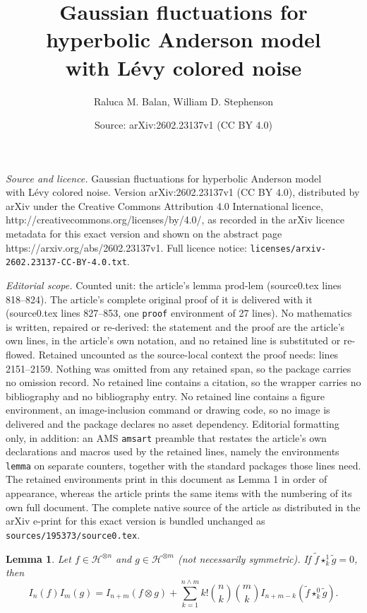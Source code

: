 \documentclass[10pt,a4paper]{amsart}
\title{Gaussian fluctuations for hyperbolic Anderson model \\ with L\'evy colored noise}
\author{Raluca M. Balan, William D. Stephenson}
\date{Source: arXiv:2602.23137v1 (CC BY 4.0)}
\newtheorem{lemma}{Lemma}
\def\cH{\mathcal{H}}
\begin{document}
\maketitle

\noindent\emph{Source and licence.} Gaussian fluctuations for hyperbolic Anderson model \\ with L\'evy colored noise. Version arXiv:2602.23137v1 (CC BY 4.0), distributed by arXiv under the Creative Commons Attribution 4.0 International licence, http://creativecommons.org/licenses/by/4.0/, as recorded in the arXiv licence metadata for this exact version and shown on the abstract page https://arxiv.org/abs/2602.23137v1. Full licence notice: \texttt{licenses/arxiv-2602.23137-CC-BY-4.0.txt}.\par\smallskip

\noindent\textit{Editorial scope.} Counted unit: the article's lemma prod-lem (source0.tex lines 818--824). The article's complete original proof of it is delivered with it (source0.tex lines 827--853, one \texttt{proof} environment of 27 lines). No mathematics is written, repaired or re-derived: the statement and the proof are the article's own lines, in the article's own notation, and no retained line is substituted or re-flowed.  Retained uncounted as the source-local context the proof needs: lines 2151--2159.  Nothing was omitted from any retained span, so the package carries no omission record.  No retained line contains a citation, so the wrapper carries no bibliography and no bibliography entry.  No retained line contains a figure environment, an image-inclusion command or drawing code, so no image is delivered and the package declares no asset dependency.  Editorial formatting only, in addition: an AMS \texttt{amsart} preamble that restates the article's own declarations and macros used by the retained lines, namely the environments \texttt{lemma} on separate counters, together with the standard packages those lines need.  The retained environments print in this document as Lemma 1 in order of appearance, whereas the article prints the same items with the numbering of its own full document.  The complete native source of the article as distributed in the arXiv e-print for this exact version is bundled unchanged as \texttt{sources/195373/source0.tex}.
\begin{lemma}
\label{prod-lem2}
Let $f \in \cH^{\otimes n}$ and $g \in \cH^{\otimes m}$ (not necessarily symmetric).
If $\tilde{f} \star_{k}^{1} \tilde{g} =0$, then
\[
I_n(f) I_m(g)
= I_{n+m}(f\otimes g)+\sum_{k=1}^{n\wedge m}k! \binom{n}{k}\binom{m}{k}I_{n+m-k}(\tilde{f} \star_{k}^{0} \tilde{g}).
\]
\end{lemma}
\end{document}

